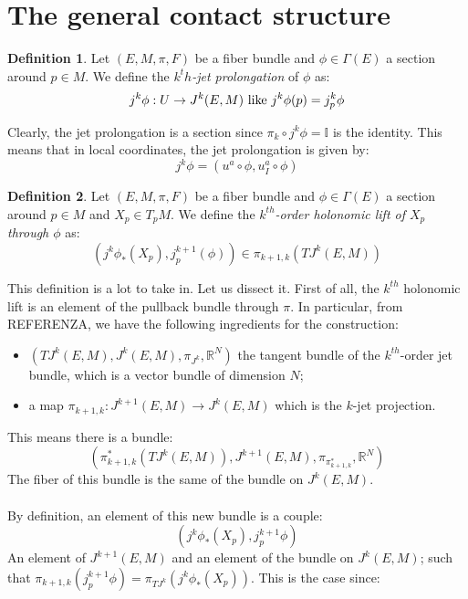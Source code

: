 \documentclass[12pt,a4paper]{report}
\theoremstyle{definition}
\newtheorem{Def}{Definition}[chapter]
\theoremstyle{Theorem}
\theoremstyle{definition}
\theoremstyle{definition}
\begin{document}
	\section{The general contact structure}
		\begin{Def}
			Let $(E,M,\pi,F)$ be a fiber bundle and $\phi\in\Gamma(E)$ a section around $p\in M$. We define the \textit{$k^th$-jet prolongation} of $\phi$ as:
			$$j^k\phi:U\rightarrow J^k(E,M)\hbox{ like }j^k\phi(p)=j^k_p\phi$$ 
		\end{Def}
		Clearly, the jet prolongation is a section since $\pi_k\circ j^k\phi=\mathbb{I}$ is the identity. This means that in local coordinates, the jet prolongation is given by:
		$$j^k\phi=(u^a\circ \phi,u^a_I\circ \phi)$$
		\begin{Def}
			Let $(E,M,\pi,F)$ be a fiber bundle and $\phi\in\Gamma(E)$ a section around $p\in M$ and $X_p\in T_pM$. We define the \textit{$k^{th}$-order holonomic lift of $X_p$ through $\phi$} as:
			$$(j^k\phi_*(X_p),j^{k+1}_p(\phi))\in\pi_{k+1,k}(TJ^k(E,M))$$ 
		\end{Def}
		This definition is a lot to take in. Let us dissect it. First of all, the $k^{th}$ holonomic lift is an element of the pullback bundle through $\pi$. In particular, from REFERENZA, we have the following ingredients for the construction:
		\begin{itemize}
			\item $(TJ^k(E,M),J^k(E,M),\pi_{J^k},\mathbb{R}^N)$ the tangent bundle of the $k^{th}$-order jet bundle, which is a vector bundle of dimension $N$;
			\item a map $\pi_{k+1,k}:J^{k+1}(E,M)\rightarrow J^k(E,M)$ which is the $k$-jet projection. 
		\end{itemize}
		This means there is a bundle:
		$$(\pi_{k+1,k}^*(TJ^k(E,M)),J^{k+1}(E,M),\pi_{\pi_{k+1,k}^*},\mathbb{R}^N)$$
		The fiber of this bundle is the same of the bundle on $J^k(E,M)$.\\
		\\
		By definition, an element of this new bundle is a couple:
		$$(j^k\phi_*(X_p),j^{k+1}_p\phi)$$
		An element of $J^{k+1}(E,M)$ and an element of the bundle on $J^k(E,M)$; such that $\pi_{k+1,k}(j^{k+1}_p\phi)=\pi_{TJ^k}(j^k\phi_*(X_p))$. This is the case since:
	
\end{document}
